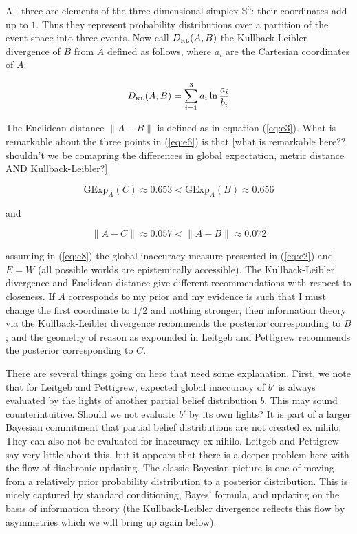 \documentclass[11pt]{article}
\begin{document}
All three are elements of the three-dimensional simplex
$\mathbb{S}^{3}$: their coordinates add up to $1$. Thus they represent
probability distributions over a partition of the event space into
three events. Now call $D_{\mbox{\tiny KL}}(A,B)$ the Kullback-Leibler
divergence of $B$ from $A$ defined as follows, where $a_{i}$ are the
Cartesian coordinates of $A$:

\begin{equation}
  \label{eq:e7}
  D_{\mbox{\tiny KL}}(A,B)=\sum_{i=1}^{3}a_{i}\ln\frac{a_{i}}{b_{i}}
\end{equation}

The Euclidean distance $\|A-B\|$ is defined as in equation
(\ref{eq:e3}). What is remarkable about the three points in
(\ref{eq:e6}) is that [what is remarkable here?? shouldn't we be
comapring the differences in global expectation, metric distance AND
Kullback-Leibler?]

\begin{equation}
  \label{eq:e8}
  \mbox{GExp}_{A}(C)\approx{}0.653<\mbox{GExp}_{A}(B)\approx{}0.656
\end{equation}

and

\begin{equation}
  \label{eq:e9}
  \|A-C\|\approx{}0.057<\|A-B\|\approx{}0.072
\end{equation}

assuming in (\ref{eq:e8}) the global inaccuracy measure presented in
(\ref{eq:e2}) and $E=W$ (all possible worlds are epistemically
accessible). The Kullback-Leibler divergence and Euclidean distance
give different recommendations with respect to closeness. If $A$
corresponds to my prior and my evidence is such that I must change the
first coordinate to $1/2$ and nothing stronger, then information
theory via the Kullback-Leibler divergence recommends the posterior
corresponding to $B$; and the geometry of reason as expounded in
Leitgeb and Pettigrew recommends the posterior corresponding to $C$. 

There are several things going on here that need some explanation.
First, we note that for Leitgeb and Pettigrew, expected global
inaccuracy of $b'$ is always evaluated by the lights of another
partial belief distribution $b$. This may sound counterintuitive.
Should we not evaluate $b'$ by its own lights? It is part of a larger
Bayesian commitment that partial belief distributions are not created
ex nihilo. They can also not be evaluated for inaccuracy ex nihilo.
Leitgeb and Pettigrew say very little about this, but it appears that
there is a deeper problem here with the flow of diachronic updating.
The classic Bayesian picture is one of moving from a relatively prior
probability distribution to a posterior distribution. This is nicely
captured by standard conditioning, Bayes' formula, and updating on the
basis of information theory (the Kullback-Leibler divergence reflects
this flow by asymmetries which we will bring up again below).
\end{document}
